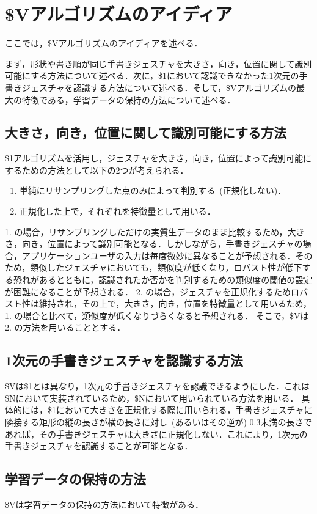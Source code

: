 \section{\$Vアルゴリズムのアイディア}
ここでは，\$Vアルゴリズムのアイディアを述べる．

まず，形状や書き順が同じ手書きジェスチャを大きさ，向き，位置に関して識別可能にする方法について述べる．次に，\$1において認識できなかった1次元の手書きジェスチャを認識する方法について述べる．そして，\$Vアルゴリズムの最大の特徴である，学習データの保持の方法について述べる．

\subsection{大きさ，向き，位置に関して識別可能にする方法}
\$1アルゴリズムを活用し，ジェスチャを大きさ，向き，位置によって識別可能にするための方法として以下の2つが考えられる．
\begin{enumerate}
\item 単純にリサンプリングした点のみによって判別する~(正規化しない)．
\item 正規化した上で，それぞれを特徴量として用いる．
\end{enumerate}
1. の場合，リサンプリングしただけの実質生データのまま比較するため，大きさ，向き，位置によって識別可能となる．しかしながら，手書きジェスチャの場合，アプリケーションユーザの入力は毎度微妙に異なることが予想される．そのため，類似したジェスチャにおいても，類似度が低くなり，ロバスト性が低下する恐れがあるとともに，認識されたか否かを判別するための類似度の閾値の設定が困難になることが予想される．
2. の場合，ジェスチャを正規化するためロバスト性は維持され，その上で，大きさ，向き，位置を特徴量として用いるため，1. の場合と比べて，類似度が低くなりづらくなると予想される．
そこで，\$Vは2. の方法を用いることとする．

\subsection{1次元の手書きジェスチャを認識する方法}
\$Vは\$1とは異なり，1次元の手書きジェスチャを認識できるようにした．これは\$N\cite{}において実装されているため，\$Nにおいて用いられている方法を用いる．
具体的には，\$1において大きさを正規化する際に用いられる，手書きジェスチャに隣接する矩形の縦の長さが横の長さに対し~(あるいはその逆が) 0.3未満の長さであれば，その手書きジェスチャは大きさに正規化しない．これにより，1次元の手書きジェスチャを認識することが可能となる．

\subsection{学習データの保持の方法}
\$Vは学習データの保持の方法において特徴がある．

